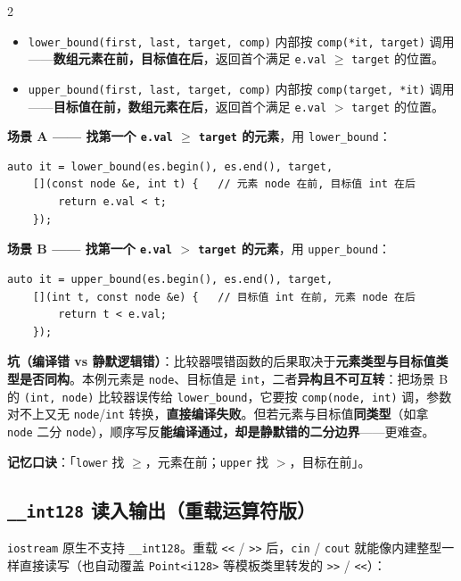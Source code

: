 \begin{multicols*}{2}
		\begin{itemize}
			\item \texttt{lower\_bound(first, last, target, comp)} 内部按 \texttt{comp(*it, target)} 调用——\textbf{数组元素在前，目标值在后}，返回首个满足 \texttt{e.val} $\ge$ \texttt{target} 的位置。
			\item \texttt{upper\_bound(first, last, target, comp)} 内部按 \texttt{comp(target, *it)} 调用——\textbf{目标值在前，数组元素在后}，返回首个满足 \texttt{e.val} $>$ \texttt{target} 的位置。
		\end{itemize}

		\textbf{场景 A —— 找第一个 \texttt{e.val} $\ge$ \texttt{target} 的元素}，用 \texttt{lower\_bound}：

		\begin{verbatim}
auto it = lower_bound(es.begin(), es.end(), target,
	[](const node &e, int t) {   // 元素 node 在前, 目标值 int 在后
		return e.val < t;
	});
		\end{verbatim}

		\textbf{场景 B —— 找第一个 \texttt{e.val} $>$ \texttt{target} 的元素}，用 \texttt{upper\_bound}：

		\begin{verbatim}
auto it = upper_bound(es.begin(), es.end(), target,
	[](int t, const node &e) {   // 目标值 int 在前, 元素 node 在后
		return t < e.val;
	});
		\end{verbatim}

		\textbf{坑（编译错 vs 静默逻辑错）}：比较器喂错函数的后果取决于\textbf{元素类型与目标值类型是否同构}。本例元素是 \texttt{node}、目标值是 \texttt{int}，二者\textbf{异构且不可互转}：把场景 B 的 \texttt{(int, node)} 比较器误传给 \texttt{lower\_bound}，它要按 \texttt{comp(node, int)} 调，参数对不上又无 \texttt{node}/\texttt{int} 转换，\textbf{直接编译失败}。但若元素与目标值\textbf{同类型}（如拿 \texttt{node} 二分 \texttt{node}），顺序写反\textbf{能编译通过，却是静默错的二分边界}——更难查。

		\textbf{记忆口诀}：「\texttt{lower} 找 $\ge$，元素在前；\texttt{upper} 找 $>$，目标在前」。

		\subsection{\texttt{\_\_int128} 读入输出（重载运算符版）}

		\texttt{iostream} 原生不支持 \texttt{\_\_int128}。重载 \texttt{<<} / \texttt{>>} 后，\texttt{cin} / \texttt{cout} 就能像内建整型一样直接读写（也自动覆盖 \texttt{Point<i128>} 等模板类里转发的 \texttt{>>} / \texttt{<<}）：


\end{multicols*}
